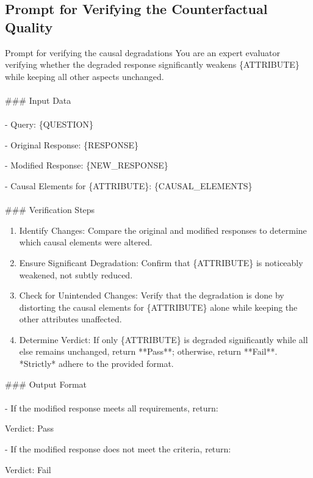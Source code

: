 \subsection{Prompt for Verifying the Counterfactual Quality}
\begin{promptbox}{Prompt for verifying the causal degradations}
You are an expert evaluator verifying whether the degraded response significantly weakens \{ATTRIBUTE\} while keeping all other aspects unchanged.
\\\\
\#\#\# Input Data
\\\\
- Query: \{QUESTION\}

- Original Response: \{RESPONSE\}

- Modified Response: \{NEW\_RESPONSE\}

- Causal Elements for \{ATTRIBUTE\}: \{CAUSAL\_ELEMENTS\}
\\\\
\#\#\# Verification Steps
\begin{enumerate}
    \item Identify Changes: Compare the original and modified responses to determine which causal elements were altered.
    \item Ensure Significant Degradation: Confirm that \{ATTRIBUTE\} is noticeably weakened, not subtly reduced.
    \item Check for Unintended Changes: Verify that the degradation is done by distorting the causal elements for \{ATTRIBUTE\} alone while keeping the other attributes unaffected.
    \item Determine Verdict: If only \{ATTRIBUTE\} is degraded significantly while all else remains unchanged, return **Pass**; otherwise, return **Fail**. *Strictly* adhere to the provided format.
\end{enumerate}

\#\#\# Output Format
\\\\
- If the modified response meets all requirements, return:

Verdict: Pass

- If the modified response does not meet the criteria, return:

Verdict: Fail
\end{promptbox}
